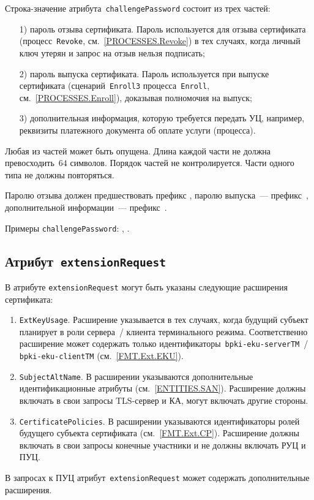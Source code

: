 Строка-значение атрибута~\texttt{challengePassword} состоит из трех частей:
\begin{enumerate} 
\item[1)]
пароль отзыва сертификата. Пароль используется для отзыва сертификата
(процесс~\texttt{Revoke}, см.~\ref{PROCESSES.Revoke})
в тех случаях, когда личный ключ утерян и запрос на отзыв нельзя 
подписать;
\item[2)]
пароль выпуска сертификата. Пароль используется при выпуске сертификата
(сценарий~\texttt{Enroll3} процесса~\texttt{Enroll}, 
см.~\ref{PROCESSES.Enroll}), доказывая полномочия на выпуск;
\item[3)]
дополнительная информация, которую требуется передать УЦ,
например, реквизиты платежного документа об оплате услуги (процесса).
\end{enumerate}

Любая из частей может быть опущена. Длина каждой части не должна 
превосходить~$64$ символов. Порядок частей не контролируется.
Части одного типа не должны повторяться.

Паролю отзыва должен предшествовать префикс 
, паролю выпуска~--- префикс~,
дополнительной информации~--- префикс~.

Примеры \texttt{challengePassword}:
, .

\subsection{Атрибут~\texttt{extensionRequest}}\label{FMT.CSR.ER}

В атрибуте \texttt{extensionRequest} могут быть указаны следующие 
расширения сертификата:
\begin{enumerate}
\item 
\texttt{ExtKeyUsage}. Расширение указывается в тех случаях, 
когда будущий субъект планирует в роли сервера~/ клиента терминального режима. 
Соответственно расширение может содержать только 
идентификаторы~\verb|bpki-eku-serverTM|~/ \verb|bpki-eku-clientTM| 
(см.~\ref{FMT.Ext.EKU}). 

\item 
\texttt{SubjectAltName}. В расширении указываются 
дополнительные идентификационные атрибуты (см.~\ref{ENTITIES.SAN}). 
Расширение должны включать в свои запросы TLS-сервер и КА,
могут включать другие стороны.

\item
\texttt{CertificatePolicies}. В расширении
указываются идентификаторы ролей будущего субъекта сертификата
(см.~\ref{FMT.Ext.CP}).
Расширение должны включать в свои запросы конечные участники 
и не должны включать РУЦ и ПУЦ.
\end{enumerate}

В запросах к ПУЦ атрибут~\texttt{extensionRequest} может содержать 
дополнительные расширения.

